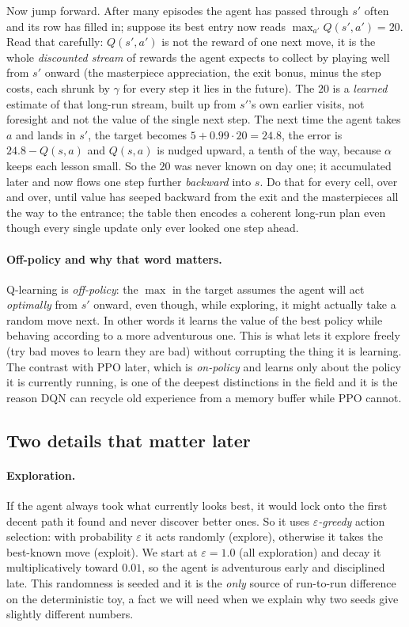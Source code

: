 \documentclass[11pt]{article}
\newcommand{\key}[1]{\textit{#1}}            %
\begin{document}
Now jump forward. After many episodes the agent has passed through $s'$ often and its row has
filled in; suppose its best entry now reads $\max_{a'}Q(s',a')=20$. Read that carefully:
$Q(s',a')$ is not the reward of one next move, it is the whole \emph{discounted stream} of
rewards the agent expects to collect by playing well from $s'$ onward (the masterpiece
appreciation, the exit bonus, minus the step costs, each shrunk by $\gamma$ for every step it
lies in the future). The $20$ is a \emph{learned} estimate of that long-run stream, built up
from $s'$'s own earlier visits, not foresight and not the value of the single next step. The next time the agent takes $a$ and
lands in $s'$, the target becomes $5+0.99\cdot 20 = 24.8$, the error is $24.8-Q(s,a)$ and
$Q(s,a)$ is nudged upward, a tenth of the way, because $\alpha$ keeps each lesson small. So the
$20$ was never known on day one; it accumulated later and now flows one step further
\emph{backward} into $s$. Do that for every cell, over and over, until value has seeped
backward from the exit and the masterpieces all the way to the entrance; the table then
encodes a coherent long-run plan even though every single update only ever looked one step
ahead.

\paragraph{Off-policy and why that word matters.} Q-learning is \key{off-policy}: the
$\max$ in the target assumes the agent will act \emph{optimally} from $s'$ onward, even
though, while exploring, it might actually take a random move next. In other words it
learns the value of the best policy while behaving according to a more adventurous one.
This is what lets it explore freely (try bad moves to learn they are bad) without
corrupting the thing it is learning. The contrast with PPO later, which is \key{on-policy}
and learns only about the policy it is currently running, is one of the deepest
distinctions in the field and it is the reason DQN can recycle old experience from a
memory buffer while PPO cannot.

\subsection{Two details that matter later}

\paragraph{Exploration.} If the agent always took what currently looks best, it would
lock onto the first decent path it found and never discover better ones. So it uses
\key{$\varepsilon$-greedy} action selection: with probability $\varepsilon$ it acts
randomly (explore), otherwise it takes the best-known move (exploit). We start at
$\varepsilon = 1.0$ (all exploration) and decay it multiplicatively toward $0.01$, so the
agent is adventurous early and disciplined late. This randomness is seeded and it is the
\emph{only} source of run-to-run difference on the deterministic toy, a fact we will need
when we explain why two seeds give slightly different numbers.
\end{document}
